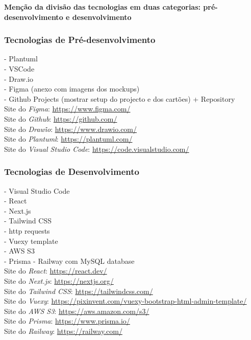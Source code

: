 \textbf{Menção da divisão das tecnologias em duas categorias: pré-desenvolvimento e desenvolvimento}

\subsubsection{Tecnologias de Pré-desenvolvimento}

- Plantuml \\
- VSCode \\
- Draw.io \\
- Figma (anexo com imagens dos mockups) \\
- Github Projects (mostrar setup do projecto e dos cartões) + Repository \\

Site do \textit{Figma}: \url{https://www.figma.com/} \\
Site do \textit{Github}: \url{https://github.com/} \\
Site do \textit{Draw\.io}: \url{https://www.drawio.com/} \\
Site do \textit{Plantuml}: \url{https://plantuml.com/} \\
Site do \textit{Visual Studio Code}: \url{https://code.visualstudio.com/} \\


\subsubsection{Tecnologias de Desenvolvimento}

- Visual Studio Code \\
- React \\
- Next.js \\
- Tailwind CSS \\
- http requests \\
- Vuexy template \\
- AWS S3 \\
- Prisma
- Railway com MySQL database \\


Site do \textit{React}: \url{https://react.dev/} \\
Site do \textit{Next.js}: \url{https://nextjs.org/} \\
Site do \textit{Tailwind CSS}: \url{https://tailwindcss.com/} \\
Site do \textit{Vuexy}: \url{https://pixinvent.com/vuexy-bootstrap-html-admin-template/} \\
Site do \textit{AWS S3}: \url{https://aws.amazon.com/s3/} \\
Site do \textit{Prisma}: \url{https://www.prisma.io/} \\
Site do \textit{Railway}: \url{https://railway.com/} \\


